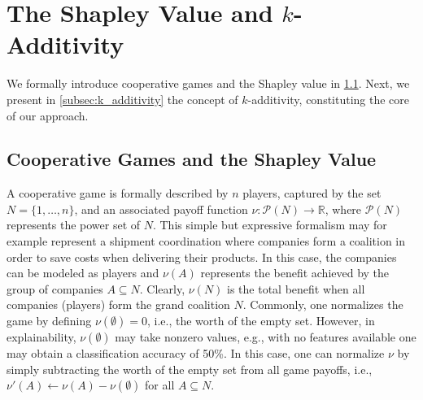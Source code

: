 \section{The Shapley Value and $k$-Additivity}
\label{sec:theory}

We formally introduce cooperative games and the Shapley value in \cref{subsec:games_shapley}.
Next, we present in \cref{subsec:k_additivity} the concept of $k$-additivity, constituting the core of our approach.

\subsection{Cooperative Games and the Shapley Value}
\label{subsec:games_shapley}

A cooperative game is formally described by $n$ players, captured by the set $N = \{1,\ldots,n\}$, and an associated payoff function $\nu : \mathcal{P}(N) \to \mathbb{R}$, where $\mathcal{P}(N)$ represents the power set of $N$.
This simple but expressive formalism may for example represent a shipment coordination where companies form a coalition in order to save costs when delivering their products.
In this case, the companies can be modeled as players
and $\nu(A)$ represents the benefit achieved by the group of companies $A \subseteq N$. %
Clearly, $\nu(N)$ is the total benefit when all companies (players) form the grand coalition $N$. Commonly, one normalizes the game by defining $\nu(\emptyset) = 0$, i.e., the worth of the empty set.
However, in explainability, $\nu(\emptyset)$ may take nonzero values, e.g., with no features available one may obtain a classification accuracy of 50\%.
In this case, one can normalize $\nu$ by simply subtracting the worth of the empty set from all game payoffs, i.e., $\nu'(A) \leftarrow \nu(A) - \nu(\emptyset)$ for all $A \subseteq N$.
 
